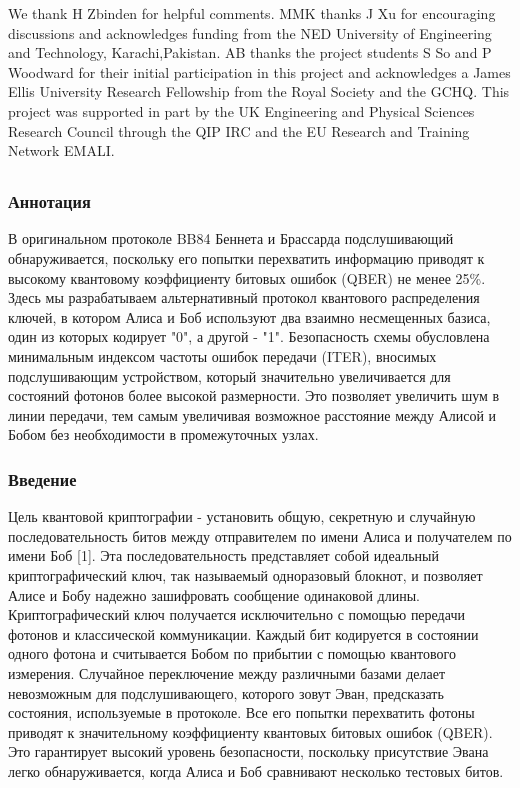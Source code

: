 We thank H Zbinden for helpful comments. MMK thanks J Xu for encouraging discussions and acknowledges funding from the NED University of Engineering and Technology, Karachi,Pakistan. AB thanks the project students S So and P Woodward for their initial participation in this project and acknowledges a James Ellis University Research Fellowship from the Royal Society and the GCHQ. This project was supported in part by the UK Engineering and Physical Sciences Research Council through the QIP IRC and the EU Research and Training Network EMALI.

\subsection{\trnas}
\subsubsection*{Аннотация}

В оригинальном протоколе BB84 Беннета и Брассарда подслушивающий обнаруживается, поскольку его попытки перехватить информацию приводят к высокому квантовому коэффициенту битовых ошибок (QBER) не менее 25\%. Здесь мы разрабатываем альтернативный протокол квантового распределения ключей, в котором Алиса и Боб используют два взаимно несмещенных базиса, один из которых кодирует "0", а другой - "1". Безопасность схемы обусловлена минимальным индексом частоты ошибок передачи (ITER), вносимых подслушивающим устройством, который значительно увеличивается для состояний фотонов более высокой размерности. Это позволяет увеличить шум в линии передачи, тем самым увеличивая возможное расстояние между Алисой и Бобом без необходимости в промежуточных узлах.

\subsubsection{Введение}

Цель квантовой криптографии - установить общую, секретную и случайную последовательность битов между отправителем по имени Алиса и получателем по имени Боб [1]. Эта последовательность представляет собой идеальный криптографический ключ, так называемый одноразовый блокнот, и позволяет Алисе и Бобу надежно зашифровать сообщение одинаковой длины. Криптографический ключ получается исключительно с помощью передачи фотонов и классической коммуникации. Каждый бит кодируется в состоянии одного фотона и считывается Бобом по прибытии с помощью квантового измерения. Случайное переключение между различными базами делает невозможным для подслушивающего, которого зовут Эван, предсказать состояния, используемые в протоколе. Все его попытки перехватить фотоны приводят к значительному коэффициенту квантовых битовых ошибок (QBER). Это гарантирует высокий уровень безопасности, поскольку присутствие Эвана легко обнаруживается, когда Алиса и Боб сравнивают несколько тестовых битов.


